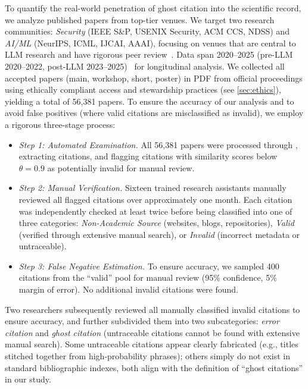 To quantify the real-world penetration of ghost citation into the scientific record, we analyze published papers from top-tier venues.
We target two research communities: \textit{Security} (IEEE S\&P, USENIX Security, ACM CCS, NDSS) and \textit{AI/ML} (NeurIPS, ICML, IJCAI, AAAI), focusing on venues that are central to LLM research and have rigorous peer review~\cite{csrankings}.
Data span 2020--2025 (pre-LLM 2020--2022, post-LLM 2023--2025)~\cite{maslej2025artificial} for longitudinal analysis.
We collected all accepted papers (main, workshop, short, poster) in PDF from official proceedings using ethically compliant access and stewardship practices (see \cref{sec:ethics}), yielding a total of 56,381 papers.
To ensure the accuracy of our analysis and to avoid false positives (where valid citations are misclassified as invalid), we employ a rigorous three-stage process:
\begin{itemize}
    \item \textit{Step 1: Automated Examination.}
    All 56,381 papers were processed through \citeb, extracting citations, and flagging citations with similarity scores below $\theta = 0.9$ as potentially invalid for manual review. 
   \item \textit{Step 2: Manual Verification.} Sixteen trained research assistants manually reviewed all flagged citations over approximately one month. Each citation was independently checked at least twice before being classified into one of three categories: \textit{Non-Academic Source} (websites, blogs, repositories), \textit{Valid} (verified through extensive manual search), or \textit{Invalid} (incorrect metadata or untraceable).

    \item \textit{Step 3: False Negative Estimation.}
    To ensure accuracy, we sampled 400 citations from the ``valid'' pool for manual review (95\% confidence, 5\% margin of error).
    No additional invalid citations were found.
\end{itemize}

Two researchers subsequently reviewed all manually classified invalid citations to ensure accuracy, and further subdivided them into two subcategories: \textit{error citation} and \textit{ghost citation} (untraceable citations cannot be found with extensive manual search).
Some untraceable citations appear clearly fabricated (e.g., titles stitched together from high-probability phrases); others simply do not exist in standard bibliographic indexes, both align with the definition of ``ghost citations'' in our study.

